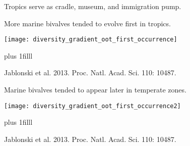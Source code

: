 \documentclass[t]{beamer}
\begin{document}
{
\begin{frame}[t,plain]{Tropics serve as cradle, museum, and immigration pump.}

\end{frame}
}

\begin{frame}[t,plain]{More marine bivalves tended to evolve first in tropics.}
	\begin{center}
		\texttt{[image: diversity\_gradient\_oot\_first\_occurrence]}
	\end{center}
	
	\vskip0pt plus 1filll
	
	\tiny Jablonski et al. 2013. Proc. Natl. Acad. Sci. 110: 10487.
\end{frame}

\begin{frame}[t,plain]{Marine bivalves tended to appear later in temperate zones.}
	\vspace{-\baselineskip}
	\begin{center}
		\texttt{[image: diversity\_gradient\_oot\_first\_occurrence2]}
	\end{center}
	
	\vskip0pt plus 1filll
	
	\tiny Jablonski et al. 2013. Proc. Natl. Acad. Sci. 110: 10487.
\end{frame}
\end{document}
